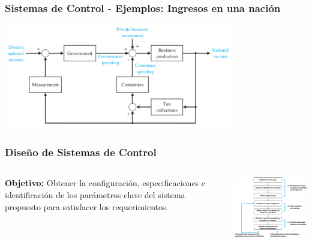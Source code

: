 \documentclass[aspectratio=169,handout]{beamer}
\theoremstyle{definition}
\theoremstyle{plain}
\theoremstyle{remark}
\begin{document}
\begin{frame}[c]\frametitle{Sistemas de Control - Ejemplos: Ingresos en una nación}
  \begin{center}
    \includegraphics[width=10cm]{images/controlsystem_example3.png}
  \end{center}
\end{frame}

\begin{frame}[c]\frametitle{Diseño de Sistemas de Control}
  \begin{columns}
    \begin{column}{0.4\textwidth}
       \textbf{Objetivo:} Obtener la configuración, especificaciones e identificación de los parámetros clave del sistema propuesto para satisfacer los requerimientos.
    \end{column}
    \begin{column}{0.6\textwidth}
      \begin{center}
        \includegraphics[width=8cm]{images/controlsystemdesign.eps}
      \end{center}
    \end{column}
  \end{columns}
\end{frame}
\end{document}
